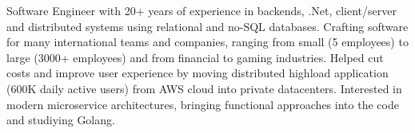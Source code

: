 

\begin{cvparagraph}

Software Engineer with 20+ years of experience in backends, .Net, client/server and distributed systems using relational and no-SQL databases. Crafting software for many international teams and companies, ranging from small (5 employees) to large (3000+ employees) and from financial to gaming industries. Helped cut costs and improve user experience by moving distributed highload application (600K daily active users) from AWS cloud into private datacenters. Interested in modern microservice architectures, bringing functional approaches into the code and studiying Golang.
\end{cvparagraph}
